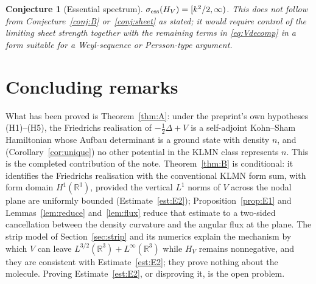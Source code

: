 \documentclass[11pt,a4paper]{article}
\theoremstyle{plain}
\newtheorem{conjecture}[theorem]{Conjecture}
\theoremstyle{definition}
\theoremstyle{remark}
\newcommand{\R}{\mathbb{R}}
\newcommand{\LL}{L^{3/2}(\R^3)+L^\infty(\R^3)}
\begin{document}
\begin{conjecture}[Essential spectrum]\label{conj:ess}
$\sigma_{\rm ess}(H_V)=[k^2/2,\infty)$. This does not follow from Conjecture~\ref{conj:B} or~\ref{conj:sheet} as stated; it would require control of the limiting sheet strength together with the remaining terms in \eqref{eq:Vdecomp} in a form suitable for a Weyl-sequence or Persson-type argument.
\end{conjecture}

\section*{Concluding remarks}
What has been proved is Theorem~\ref{thm:A}: under the preprint's own hypotheses (H1)--(H5), the Friedrichs realisation of $-\tfrac12\Delta+V$ is a self-adjoint Kohn--Sham Hamiltonian whose Aufbau determinant is a ground state with density $n$, and (Corollary~\ref{cor:unique}) no other potential in the KLMN class represents $n$. This is the completed contribution of the note. Theorem~\ref{thm:B} is conditional: it identifies the Friedrichs realisation with the conventional KLMN form sum, with form domain $H^1(\R^3)$, provided the vertical $L^1$ norms of $V$ across the nodal plane are uniformly bounded (Estimate~\ref{est:E2}); Proposition~\ref{prop:E1} and Lemmas~\ref{lem:reduce} and~\ref{lem:flux} reduce that estimate to a two-sided cancellation between the density curvature and the angular flux at the plane. The strip model of Section~\ref{sec:strip} and its numerics explain the mechanism by which $V$ can leave $\LL$ while $H_V$ remains nonnegative, and they are consistent with Estimate~\ref{est:E2}; they prove nothing about the molecule. Proving Estimate~\ref{est:E2}, or disproving it, is the open problem.
\end{document}
